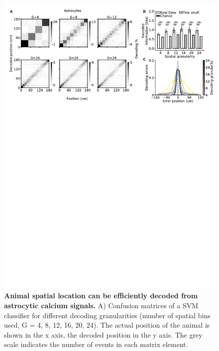 \begin{figure}[h]
    \centering
    \includegraphics[trim={0 450 0 0}, clip, width=\textwidth]{Figures/Chapter1/intro_fig_seba_3.pdf}
    \caption[Animal spatial location can be efficiently decoded from astrocytic calcium signals]{\textbf{Animal spatial location can be efficiently decoded from astrocytic calcium signals.} 
    A) Confusion matrices of a SVM classifier for different decoding granularities (number of spatial bins used, G = 4, 8, 12, 16, 20, 24). The actual position of the animal is shown in the x axis, the decoded position in the y axis. The grey scale indicates the number of events in each matrix element. 
}
\end{figure}
